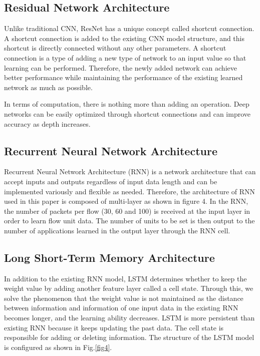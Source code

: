 \subsection{Residual Network Architecture}
Unlike traditional CNN, ResNet \cite{DBLP:journals:corr:HeZRS15} has a unique concept called shortcut connection.
A shortcut connection is added to the existing CNN model structure, and this shortcut is directly connected without any other parameters.
A shortcut connection is a type of adding a new type of network to an input value so that learning can be performed.
Therefore, the newly added network can achieve better performance while maintaining the performance of the existing learned network as much as possible.

In terms of computation, there is nothing more than adding an operation.
Deep networks can be easily optimized through shortcut connections and can improve accuracy as depth increases.

\subsection{Recurrent Neural Network Architecture}
Recurrent Neural Network Architecture (RNN) \cite{J279188} is a network architecture that can accept inputs and outputs regardless of input data length and can be implemented variously and flexible as needed.
Therefore, the architecture of RNN used in this paper is composed of multi-layer as shown in figure 4.
In the RNN, the number of packets per flow (30, 60 and 100) is received at the input layer in order to learn flow unit data.
The number of units to be set is then output to the number of applications learned in the output layer through the RNN cell.

\subsection{Long Short-Term Memory Architecture}
In addition to the existing RNN model, LSTM \cite{Hochreiter:1997:LSM:1246443.1246450} determines whether to keep the weight value by adding another feature layer called a cell state.
Through this, we solve the phenomenon that the weight value is not maintained as the distance between information and information of one input data in the existing RNN becomes longer, and the learning ability decreases.
LSTM is more persistent than existing RNN because it keeps updating the past data.
The cell state is responsible for adding or deleting information.
The structure of the LSTM model is configured as shown in Fig.\ref{fig4}.

